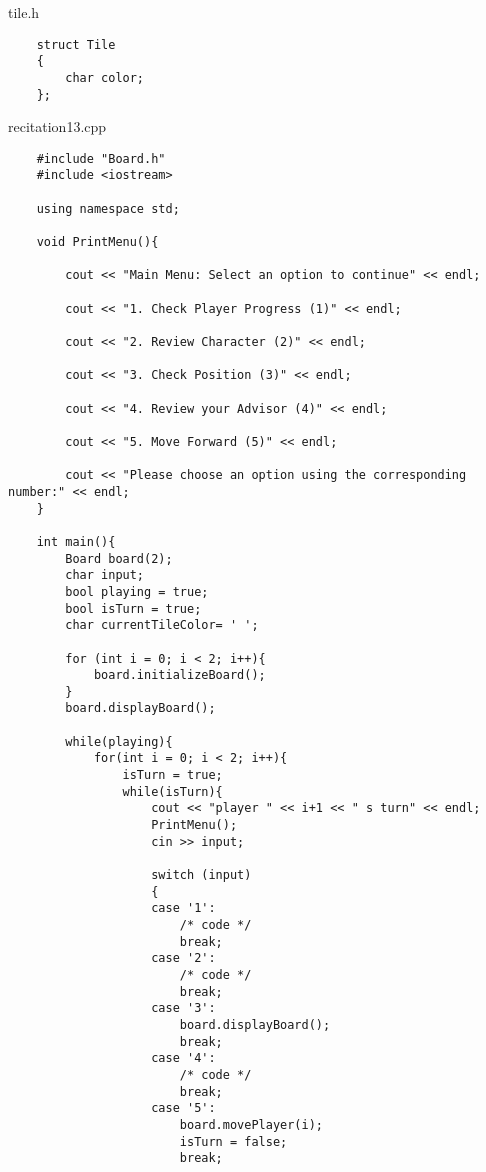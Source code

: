 \documentclass{article}
\begin{document}
\vspace{1cm}

tile.h

\vspace{1cm}

\begin{verbatim}
    struct Tile
    {
        char color;
    };
\end{verbatim}

\vspace{1cm}

recitation13.cpp

\vspace{1cm}

\begin{verbatim}
    #include "Board.h"
    #include <iostream>
    
    using namespace std;
    
    void PrintMenu(){
    
        cout << "Main Menu: Select an option to continue" << endl;
        
        cout << "1. Check Player Progress (1)" << endl;
        
        cout << "2. Review Character (2)" << endl;
        
        cout << "3. Check Position (3)" << endl;
        
        cout << "4. Review your Advisor (4)" << endl;
        
        cout << "5. Move Forward (5)" << endl;
        
        cout << "Please choose an option using the corresponding number:" << endl;
    }
    
    int main(){
        Board board(2);
        char input;
        bool playing = true;
        bool isTurn = true;
        char currentTileColor= ' ';
    
        for (int i = 0; i < 2; i++){
            board.initializeBoard();
        }
        board.displayBoard();
    
        while(playing){
            for(int i = 0; i < 2; i++){
                isTurn = true;
                while(isTurn){
                    cout << "player " << i+1 << " s turn" << endl;
                    PrintMenu();
                    cin >> input;
    
                    switch (input)
                    {
                    case '1':
                        /* code */
                        break;
                    case '2':
                        /* code */
                        break;
                    case '3':
                        board.displayBoard();
                        break;
                    case '4':
                        /* code */
                        break;
                    case '5':
                        board.movePlayer(i);
                        isTurn = false;
                        break;
                    

\end{verbatim}
\end{document}
